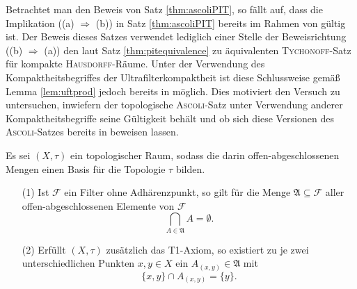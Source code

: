 Betrachtet man den Beweis von Satz \ref{thm:ascoliPIT}, so fällt auf, dass die Implikation ((a) $\Rightarrow$ (b)) in Satz \ref{thm:ascoliPIT} bereits im Rahmen von \ZF gültig ist.
Der Beweis dieses Satzes verwendet lediglich einer Stelle der Beweisrichtung ((b) $\Rightarrow$ (a)) den laut Satz \ref{thm:pitequivalence} zu \PIT äquivalenten \textsc{Tychonoff}\hyp{}Satz für kompakte \textsc{Hausdorff}\hyp{}Räume.
Unter der Verwendung des Kompaktheitsbegriffes der Ultrafilterkompaktheit ist diese Schlussweise gemäß Lemma \ref{lem:uftprod} jedoch bereits in \ZF möglich.  
Dies motiviert den Versuch zu untersuchen, inwiefern der topologische \textsc{Ascoli}\hyp{}Satz unter Verwendung anderer Kompaktheitsbegriffe seine Gültigkeit behält und ob sich diese Versionen des \textsc{Ascoli}\hyp{}Satzes bereits in \ZF beweisen lassen.

\begin{lem}
  \label{lem:filterclusterpoint}
  Es sei $(X,\tau)$ ein topologischer Raum, sodass die darin offen\hyp{}abgeschlossenen Mengen einen Basis für die Topologie $\tau$ bilden.
  \begin{itemize}
    \item[(1)] Ist $\mathcal{F}$ ein Filter ohne Adhärenzpunkt, so gilt für die Menge $\mathfrak{A} \subseteq \mathcal{F}$ aller offen\hyp{}abgeschlossenen Elemente von $\mathcal{F}$
     \begin{displaymath}
       \bigcap_{A \in \mathfrak{A}} A = \emptyset.
     \end{displaymath}
   \item[(2)] Erfüllt $(X,\tau)$ zusätzlich das T1\hyp{}Axiom, so existiert zu je zwei unterschiedlichen Punkten $x,y \in X$ ein $A_{(x,y)} \in \mathfrak{A}$ mit 
     \begin{displaymath}
       \{x,y\} \cap A_{(x,y)} = \{y\}.
     \end{displaymath}
  \end{itemize}
\end{lem}

